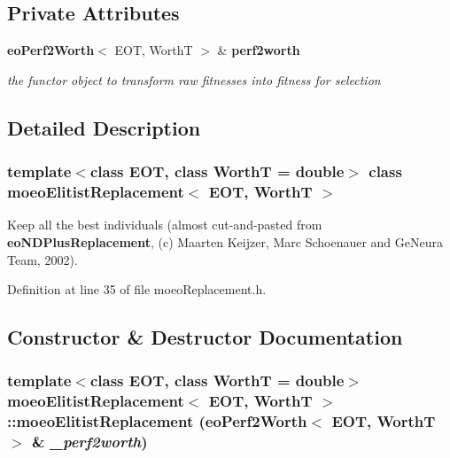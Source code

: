\subsection*{Private Attributes}
\begin{CompactItemize}
\item 
{\bf eo\-Perf2Worth}$<$ EOT, Worth\-T $>$ \& {\bf perf2worth}\label{classmoeoElitistReplacement_020f0e0b6b88a0081d922cca5b05990e}

\begin{CompactList}\small\item\em the functor object to transform raw fitnesses into fitness for selection \item\end{CompactList}\end{CompactItemize}


\subsection{Detailed Description}
\subsubsection*{template$<$class EOT, class Worth\-T = double$>$ class moeo\-Elitist\-Replacement$<$ EOT, Worth\-T $>$}

Keep all the best individuals (almost cut-and-pasted from {\bf eo\-NDPlus\-Replacement}, (c) Maarten Keijzer, Marc Schoenauer and Ge\-Neura Team, 2002). 



Definition at line 35 of file moeo\-Replacement.h.

\subsection{Constructor \& Destructor Documentation}
\subsubsection{\setlength{\rightskip}{0pt plus 5cm}template$<$class EOT, class Worth\-T = double$>$ {\bf moeo\-Elitist\-Replacement}$<$ EOT, Worth\-T $>$::{\bf moeo\-Elitist\-Replacement} ({\bf eo\-Perf2Worth}$<$ EOT, Worth\-T $>$ \& {\em \_\-perf2worth})\hspace{0.3cm}{\tt  [inline]}}\label{classmoeoElitistReplacement_fa62ed508ac194ed7b720e37dd22458c}


